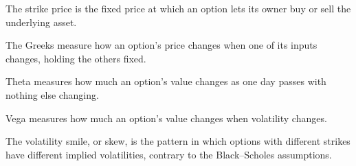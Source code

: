 \begin{keyterms}
\begin{description}[leftmargin=0pt, itemsep=2pt, parsep=0pt, font=\normalfont\bfseries\color{FEMaroon}]
  \item[Strike price.] The strike price is the fixed price at which an option lets its owner buy or sell the underlying asset.
  \item[The Greeks.] The Greeks measure how an option's price changes when one of its inputs changes, holding the others fixed.
  \item[Theta.] Theta measures how much an option's value changes as one day passes with nothing else changing.
  \item[Vega.] Vega measures how much an option's value changes when volatility changes.
  \item[Volatility smile and skew.] The volatility smile, or skew, is the pattern in which options with different strikes have different implied volatilities, contrary to the Black--Scholes assumptions.
\end{description}
\end{keyterms}
